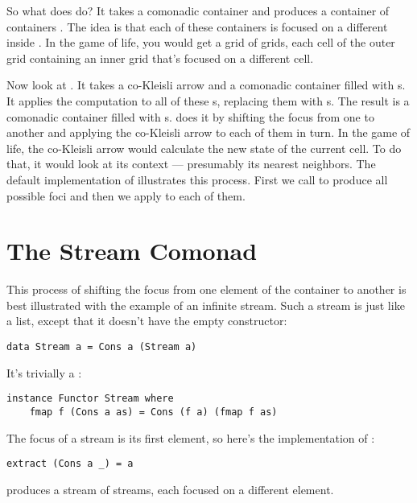 So what does  do? It takes a comonadic container
 and produces a container of containers .
The idea is that each of these containers is focused on a different
 inside . In the game of life, you would get a
grid of grids, each cell of the outer grid containing an inner grid
that's focused on a different cell.

Now look at . It takes a co-Kleisli arrow and a comonadic
container  filled with s. It applies the
computation to all of these s, replacing them with
s. The result is a comonadic container filled with
s.  does it by shifting the focus from one
 to another and applying the co-Kleisli arrow to each of them
in turn. In the game of life, the co-Kleisli arrow would calculate the
new state of the current cell. To do that, it would look at its context
--- presumably its nearest neighbors. The default implementation of
 illustrates this process. First we call
 to produce all possible foci and then we apply
 to each of them.

\section{The Stream Comonad}\label{the-stream-comonad}

This process of shifting the focus from one element of the container to
another is best illustrated with the example of an infinite stream. Such
a stream is just like a list, except that it doesn't have the empty
constructor:

\begin{Verbatim}[commandchars=\\\{\}]
data Stream a = Cons a (Stream a)
\end{Verbatim}
It's trivially a :

\begin{Verbatim}[commandchars=\\\{\}]
instance Functor Stream where
    fmap f (Cons a as) = Cons (f a) (fmap f as)
\end{Verbatim}
The focus of a stream is its first element, so here's the implementation
of :

\begin{Verbatim}[commandchars=\\\{\}]
extract (Cons a _) = a
\end{Verbatim}
 produces a stream of streams, each focused on a
different element.

